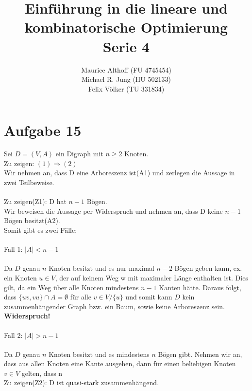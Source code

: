 \documentclass[a4paper,10pt,german]{scrartcl}
\title{Einführung in die lineare und kombinatorische Optimierung\\
Serie 4}
\author{Maurice Althoff (FU 4745454)\\Michael R. Jung (HU 502133)\\Felix Völker (TU 331834)}
\begin{document}
\maketitle

\section{Aufgabe 15}

Sei $D = (V,A)$ ein Digraph mit $n \ge 2$ Knoten.\\
Zu zeigen: $(1) \Rightarrow (2)$\\
Wir nehmen an, dass D eine Arboreszenz ist(A1) und zerlegen die Aussage in zwei Teilbeweise.\\
\\
Zu zeigen(Z1): D hat $n-1$ Bögen.\\ 
Wir beweisen die Aussage per Widerspruch und nehmen an, dass D keine $n-1$ Bögen besitzt(A2).\\
Somit gibt es zwei Fälle:\\
\\
Fall 1: $|A| < n - 1$\\
\\
Da $D$ genau $n$ Knoten besitzt und es nur maximal $n - 2$ Bögen geben kann, ex. ein Knoten $u \in V$, der auf keinem Weg w mit maximaler Länge enthalten ist. Dies gilt, da ein Weg über alle Knoten mindestens $n - 1$ Kanten hätte. Daraus folgt, dass $\{uv,vu\} \cap A = \emptyset$ für alle $v \in V / \{u\}$ und somit kann $D$ kein zusammenhängender Graph bzw. ein Baum, sowie keine Arboreszenz sein. \textbf{Widerspruch!}\\
\\
Fall 2: $|A| > n - 1$\\
\\
Da $D$ genau $n$ Knoten besitzt und es mindestens $n$ Bögen gibt. Nehmen wir an, dass aus allen Knoten eine Kante ausgehen, dann  für einen beliebigen Knoten $v \in V$ gelten, dass n
\\
Zu zeigen(Z2): D ist quasi-stark zusammenhängend.\\
\end{document}
